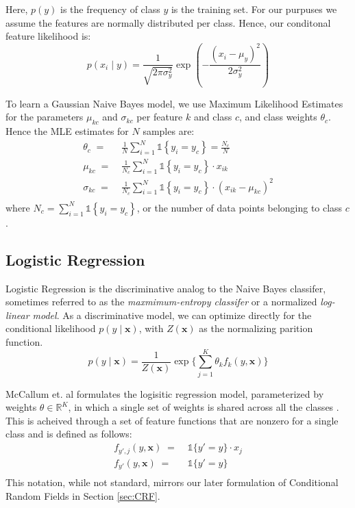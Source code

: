 \documentclass{article}
\begin{document}
Here, $p(y)$ is the frequency of class $y$ is the training set.
For our purpuses we assume the features are normally distributed per class.
Hence, our conditonal feature likelihood is:
\begin{equation}
  p(x_i \mid y) = \frac{1}{\sqrt{2\pi\sigma^2_y}} \exp\left(-\frac{(x_i - \mu_y)^2}{2\sigma^2_y}\right)
\end{equation}

To learn a Gaussian Naive Bayes model, we use Maximum Likelihood Estimates for
the parameters $\mu_{kc}$ and $\sigma_{kc}$ per feature $k$ and class $c$, and class weights
$\theta_c$. Hence the MLE estimates for $N$ samples are:
\begin{equation}
  \begin{aligned}
    \theta_c \; = \; & \frac{1}{N} \sum_{i=1}^N \mathds{1} \left \{ y_i = y_c \right \} = \frac{N_c}{N} \\
    \mu_{kc} \; = \; & \frac{1}{N_c} \sum_{i=1}^N \mathds{1} \left \{ y_i = y_c \right \} \cdot x_{ik} \\
    \sigma_{kc} \; = \; & \frac{1}{N_c} \sum_{i=1}^N \mathds{1} \left \{ y_i = y_c \right \} \cdot \left( x_{ik} - \mu_{kc} \right)^2 \\
  \end{aligned}
\end{equation}
where $N_c = \sum_{i=1}^N \mathds{1} \left \{ y_i = y_c \right \} $, or the number
of data points belonging to class $c$ \cite{murphy}.
\subsection{Logistic Regression}
\label{sec:LR}
Logistic Regression is the discriminative analog to the Naive Bayes
classifer, sometimes referred to as the \textit{maxmimum-entropy classifer}
or a normalized \textit{log-linear model}. As a discriminative model,
we can optimize directly for the conditional likelihood $p(y \mid \mathbf{x})$,
with $Z(\mathbf{x})$ as the normalizing parition function.
\begin{equation}
  p(y \mid \mathbf{x}) = \frac{1}{Z(\mathbf{x})} \exp \Bigg\{ \sum_{j=1}^K \theta_k f_k\left( y, \mathbf{x} \right) \Bigg\}
\end{equation}

McCallum et. al formulates the logisitic regression model, parameterized by
weights $\theta \in \mathbb{R}^K$, in which a single set of weights is shared
across all the classes \cite{McCallumCRF}. This is acheived through a set of
feature functions that are nonzero for a single class and is defined as follows:
\begin{equation}
  \begin{aligned}
    f_{y', j} \left( y, \mathbf{x} \right) \; = \; & \mathds{1} \{ y' = y \} \cdot x_j \\
    f_{y'} \left(y, \mathbf{x}\right) \; = \; & \mathds{1} \{ y' = y \} \\
  \end{aligned}
\end{equation}
This notation, while not standard, mirrors our later formulation of Conditional
Random Fields in Section \ref{sec:CRF}.
\end{document}
